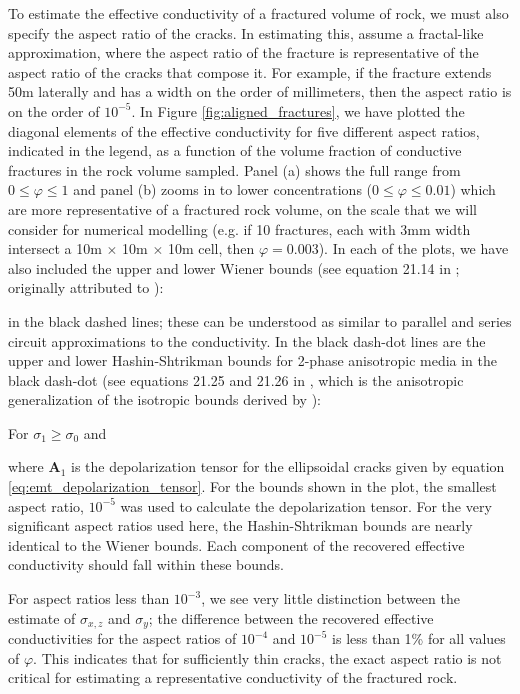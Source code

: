 To estimate the effective conductivity of a fractured volume of rock, we must also specify the aspect ratio of the cracks. In estimating this, assume a fractal-like approximation, where the aspect ratio of the fracture is representative of the aspect ratio of the cracks that compose it. For example, if the fracture extends 50m laterally and has a width on the order of millimeters, then the aspect ratio is on the order of $10^{-5}$. In Figure \ref{fig:aligned_fractures}, we have plotted the diagonal elements of the effective conductivity for five different aspect ratios, indicated in the legend, as a function of the volume fraction of conductive fractures in the rock volume sampled. Panel (a) shows the full range from $0 \leq \varphi \leq 1$ and panel (b) zooms in to lower concentrations ($0 \leq \varphi \leq 0.01$) which are more representative of a fractured rock volume, on the scale that we will consider for numerical modelling (e.g. if 10 fractures, each with 3mm width intersect a 10m $\times$ 10m $\times$ 10m cell, then $\varphi = 0.003$). In each of the plots, we have also included the upper and lower Wiener bounds (see equation 21.14 in \cite{Torquato2002}; originally attributed to \cite{Wiener1912}):

in the black dashed lines; these can be understood as similar to parallel and series circuit approximations to the conductivity. In the black dash-dot lines are the upper and lower Hashin-Shtrikman bounds for 2-phase anisotropic media in the black dash-dot (see equations 21.25 and 21.26 in \cite{Torquato2002}, which is the anisotropic generalization of the isotropic bounds derived by \cite{Hashin1962}):

For $\sigma_1 \geq \sigma_0$ and

where $\mathbf{A}_1$ is the depolarization tensor for the ellipsoidal cracks given by equation \ref{eq:emt_depolarization_tensor}. For the bounds shown in the plot, the smallest aspect ratio, $10^{-5}$ was used to calculate the depolarization tensor. For the very significant aspect ratios used here, the Hashin-Shtrikman bounds are nearly identical to the Wiener bounds. Each component of the recovered effective conductivity should fall within these bounds.



For aspect ratios less than $10^{-3}$, we see very little distinction between the estimate of $\sigma_{x, z}$ and $\sigma_{y}$; the difference between the recovered effective conductivities for the aspect ratios of $10^{-4}$ and $10^{-5}$ is less than 1\% for all values of $\varphi$. This indicates that for sufficiently thin cracks, the exact aspect ratio is not critical for estimating a representative conductivity of the fractured rock.

